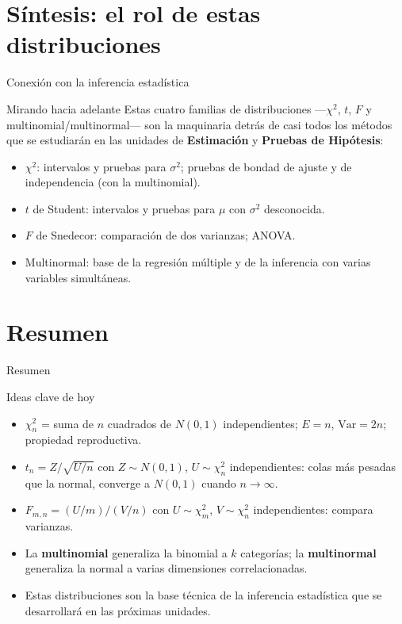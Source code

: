 \documentclass[aspectratio=169,11pt]{beamer}
\begin{document}
\section{Síntesis: el rol de estas distribuciones}

\begin{frame}{Conexión con la inferencia estadística}
\begin{block}{Mirando hacia adelante}
Estas cuatro familias de distribuciones —$\chi^2$, $t$, $F$ y multinomial/multinormal— son la maquinaria detrás de casi todos los métodos que se estudiarán en las unidades de \textbf{Estimación} y \textbf{Pruebas de Hipótesis}:
\begin{itemize}
\item $\chi^2$: intervalos y pruebas para $\sigma^2$; pruebas de bondad de ajuste y de independencia (con la multinomial).
\item $t$ de Student: intervalos y pruebas para $\mu$ con $\sigma^2$ desconocida.
\item $F$ de Snedecor: comparación de dos varianzas; ANOVA.
\item Multinormal: base de la regresión múltiple y de la inferencia con varias variables simultáneas.
\end{itemize}
\end{block}
\end{frame}

\section{Resumen}

\begin{frame}{Resumen}
\begin{block}{Ideas clave de hoy}
\begin{itemize}
\item $\chi^2_n$ = suma de $n$ cuadrados de $N(0,1)$ independientes; $E=n$, $\text{Var}=2n$; propiedad reproductiva.
\item $t_n = Z/\sqrt{U/n}$ con $Z\sim N(0,1)$, $U\sim\chi_n^2$ independientes: colas más pesadas que la normal, converge a $N(0,1)$ cuando $n\to\infty$.
\item $F_{m,n} = (U/m)/(V/n)$ con $U\sim\chi_m^2$, $V\sim\chi_n^2$ independientes: compara varianzas.
\item La \textbf{multinomial} generaliza la binomial a $k$ categorías; la \textbf{multinormal} generaliza la normal a varias dimensiones correlacionadas.
\item Estas distribuciones son la base técnica de la inferencia estadística que se desarrollará en las próximas unidades.
\end{itemize}
\end{block}
\end{frame}
\end{document}
